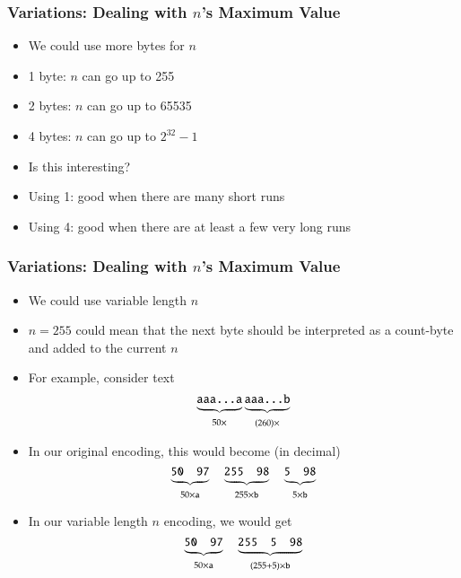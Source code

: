 \documentclass{../ucll-slides}
\begin{document}
\begin{frame}
  \frametitle{Variations: Dealing with $n$'s Maximum Value}
  \begin{itemize}
    \item We could use more bytes for $n$
    \item 1 byte: $n$ can go up to 255
    \item 2 bytes: $n$ can go up to 65535
    \item 4 bytes: $n$ can go up to $2^{32}-1$
    \item Is this interesting?
    \item Using 1: good
          when there are many short runs
    \item Using 4: good
          when there are at least a few very long runs
  \end{itemize}
\end{frame}

\begin{frame}
  \frametitle{Variations: Dealing with $n$'s Maximum Value}
  \begin{itemize}
    \item We could use variable length $n$
    \item $n = 255$ could mean that the next byte should be interpreted as a count-byte and added to the current $n$
    \item For example, consider text
          \[
            \underbrace{\texttt{aaa\dots a}}_{50\times}\underbrace{\texttt{aaa\dots b}}_{(260)\times}
          \]
    \item In our original encoding, this would become (in decimal)
          \[
            \underbrace{\tt 50 \quad 97}_{50\times\tt a} \quad \underbrace{\tt 255 \quad 98}_{255\times\tt b} \quad \underbrace{\tt 5 \quad 98}_{5\times\tt b}
          \]
    \item In our variable length $n$ encoding, we would get
          \[
            \underbrace{\tt 50 \quad 97}_{50\times\tt a} \quad \underbrace{\tt 255 \quad 5 \quad 98}_{(255+5)\times\tt b}
          \]
  \end{itemize}
\end{frame}
\end{document}
